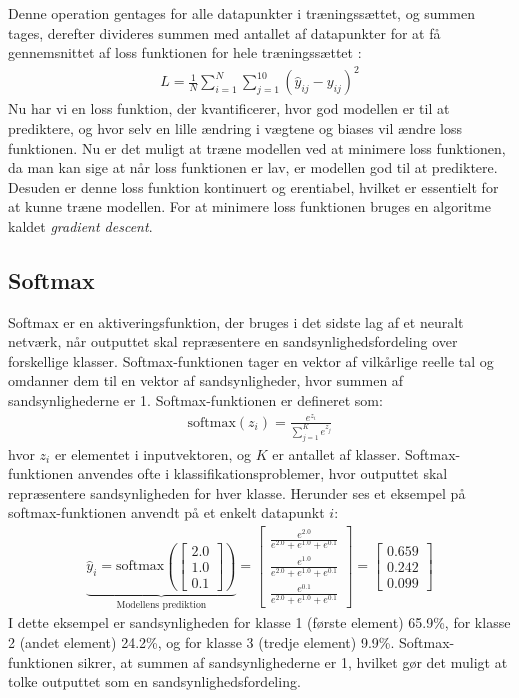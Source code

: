 \documentclass{article}
\begin{document}
Denne operation gentages for alle datapunkter i træningssættet, og summen tages, derefter divideres summen med antallet af datapunkter for at få gennemsnittet af loss funktionen for hele træningssættet \parencite{Sanderson_2017}:
\begin{align}
  L = \frac{1}{N} \sum_{i=1}^{N} \sum_{j=1}^{10} (\hat{y}_{ij} - y_{ij})^2
\end{align}
Nu har vi en loss funktion, der kvantificerer, hvor god modellen er til at prediktere, og hvor selv en lille ændring i vægtene og biases vil ændre loss funktionen. Nu er det muligt at træne modellen ved at minimere loss funktionen, da man kan sige at når loss funktionen er lav, er modellen god til at prediktere. Desuden er denne loss funktion kontinuert og erentiabel, hvilket er essentielt for at kunne træne modellen. For at minimere loss funktionen bruges en algoritme kaldet \textit{gradient descent}.

\subsection{Softmax}
Softmax er en aktiveringsfunktion, der bruges i det sidste lag af et neuralt netværk, når outputtet skal repræsentere en sandsynlighedsfordeling over forskellige klasser. Softmax-funktionen tager en vektor af vilkårlige reelle tal og omdanner dem til en vektor af sandsynligheder, hvor summen af sandsynlighederne er 1. Softmax-funktionen er defineret som:
\begin{align}
  \text{softmax}(z_i) = \frac{e^{z_i}}{\sum_{j=1}^{K} e^{z_j}}
\end{align}
hvor $z_i$ er elementet i inputvektoren, og $K$ er antallet af klasser. Softmax-funktionen anvendes ofte i klassifikationsproblemer, hvor outputtet skal repræsentere sandsynligheden for hver klasse. Herunder ses et eksempel på softmax-funktionen anvendt på et enkelt datapunkt $i$:
\begin{align}
  \underbrace{\hat{y}_i = \text{softmax}\left(\begin{bmatrix}
    2.0 \\
    1.0 \\
    0.1
  \end{bmatrix}\right)}_{\text{Modellens prediktion}}
  = \begin{bmatrix}
    \frac{e^{2.0}}{e^{2.0} + e^{1.0} + e^{0.1}} \\
    \frac{e^{1.0}}{e^{2.0} + e^{1.0} + e^{0.1}} \\
    \frac{e^{0.1}}{e^{2.0} + e^{1.0} + e^{0.1}}
  \end{bmatrix}
  = \begin{bmatrix}
    0.659 \\
    0.242 \\
    0.099
  \end{bmatrix}
\end{align}
I dette eksempel er sandsynligheden for klasse 1 (første element) 65.9\%, for klasse 2 (andet element) 24.2\%, og for klasse 3 (tredje element) 9.9\%. Softmax-funktionen sikrer, at summen af sandsynlighederne er 1, hvilket gør det muligt at tolke outputtet som en sandsynlighedsfordeling. \parencite{Sanderson_2017}
\end{document}
